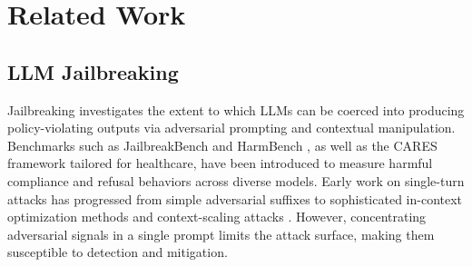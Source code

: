 \documentclass[11pt]{article}
\newif\ifcomments
\newcommand{\yaling}[1]{\ifcomments{\color{brown}{yaling: #1}}\fi}
\begin{document}
    




\section{Related Work}
\subsection{LLM Jailbreaking}

Jailbreaking investigates the extent to which LLMs can be coerced into producing policy-violating outputs via adversarial prompting and contextual manipulation.
Benchmarks such as JailbreakBench \cite{chao2024jailbreakbench} and HarmBench \cite{2024harm}, as well as the CARES framework \cite{li2025cares} tailored for healthcare, have been introduced to measure harmful compliance and refusal behaviors across diverse models.
Early work on single-turn attacks has progressed from simple adversarial suffixes \cite{zou2023universal} to sophisticated in-context optimization methods \cite{wang2025pig} and context-scaling attacks \cite{anil2024many}. However, concentrating adversarial signals in a single prompt limits the attack surface, making them susceptible to detection and mitigation. 
\end{document}
